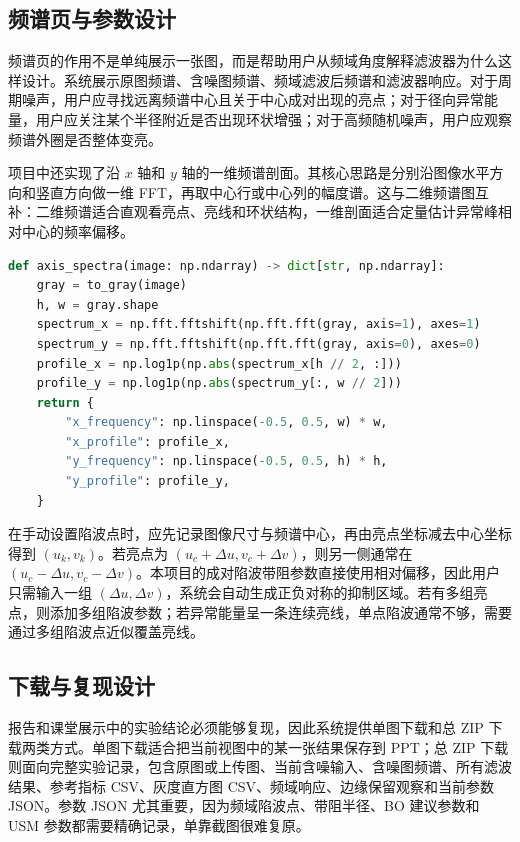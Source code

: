 \documentclass[UTF8,a4paper,12pt]{ctexart}
\begin{document}
\subsection{频谱页与参数设计}

频谱页的作用不是单纯展示一张图，而是帮助用户从频域角度解释滤波器为什么这样设计。系统展示原图频谱、含噪图频谱、频域滤波后频谱和滤波器响应。对于周期噪声，用户应寻找远离频谱中心且关于中心成对出现的亮点；对于径向异常能量，用户应关注某个半径附近是否出现环状增强；对于高频随机噪声，用户应观察频谱外圈是否整体变亮。

项目中还实现了沿 $x$ 轴和 $y$ 轴的一维频谱剖面。其核心思路是分别沿图像水平方向和竖直方向做一维 FFT，再取中心行或中心列的幅度谱。这与二维频谱图互补：二维频谱适合直观看亮点、亮线和环状结构，一维剖面适合定量估计异常峰相对中心的频率偏移。

\begin{lstlisting}[language=Python,caption={轴向频谱剖面的计算方式}]
def axis_spectra(image: np.ndarray) -> dict[str, np.ndarray]:
    gray = to_gray(image)
    h, w = gray.shape
    spectrum_x = np.fft.fftshift(np.fft.fft(gray, axis=1), axes=1)
    spectrum_y = np.fft.fftshift(np.fft.fft(gray, axis=0), axes=0)
    profile_x = np.log1p(np.abs(spectrum_x[h // 2, :]))
    profile_y = np.log1p(np.abs(spectrum_y[:, w // 2]))
    return {
        "x_frequency": np.linspace(-0.5, 0.5, w) * w,
        "x_profile": profile_x,
        "y_frequency": np.linspace(-0.5, 0.5, h) * h,
        "y_profile": profile_y,
    }
\end{lstlisting}

在手动设置陷波点时，应先记录图像尺寸与频谱中心，再由亮点坐标减去中心坐标得到 $(u_k,v_k)$。若亮点为 $(u_c+\Delta u,v_c+\Delta v)$，则另一侧通常在 $(u_c-\Delta u,v_c-\Delta v)$。本项目的成对陷波带阻参数直接使用相对偏移，因此用户只需输入一组 $(\Delta u,\Delta v)$，系统会自动生成正负对称的抑制区域。若有多组亮点，则添加多组陷波参数；若异常能量呈一条连续亮线，单点陷波通常不够，需要通过多组陷波点近似覆盖亮线。

\subsection{下载与复现设计}

报告和课堂展示中的实验结论必须能够复现，因此系统提供单图下载和总 ZIP 下载两类方式。单图下载适合把当前视图中的某一张结果保存到 PPT；总 ZIP 下载则面向完整实验记录，包含原图或上传图、当前含噪输入、含噪图频谱、所有滤波结果、参考指标 CSV、灰度直方图 CSV、频域响应、边缘保留观察和当前参数 JSON。参数 JSON 尤其重要，因为频域陷波点、带阻半径、BO 建议参数和 USM 参数都需要精确记录，单靠截图很难复原。
\end{document}

